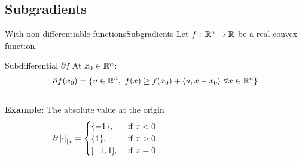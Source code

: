 \documentclass[10pt,aspectratio=43]{beamer}
\begin{document}
\subsection{Subgradients}
\begin{frame}{With non-differentiable functions}{Subgradients}
Let $f:\,\mathbb{R}^n\rightarrow \mathbb{R}$ be a real convex function.
\begin{block}{Subdifferential $\partial f$}
    At $x_0\in\mathbb{R}^n$:
    \begin{align*}
        \partial f(x_0) = \left\{ u \in \mathbb{R}^n,\ f(x) \geq f(x_0) +
        \langle u, x-x_0\rangle\ \forall x\in \mathbb{R}^n\right\}
    \end{align*}
\end{block}
\begin{columns}
\begin{column}{.4\textwidth}
\textbf{Example: } The absolute value at the origin
\[\partial \left \vert \cdot \right \vert_{|x} =
\begin{cases}
    \{-1\}, & \text{ if } x <0\\
    \{1\}, & \text{ if }x>0 \\
    [-1, 1],& \text{ if } x=0 \end{cases}
\]
\end{column}
\begin{column}{.6\textwidth}
\begin{figure}[h]
    \centering
{}
\end{figure}
\end{column}
\end{columns}
\end{frame}
\end{document}
